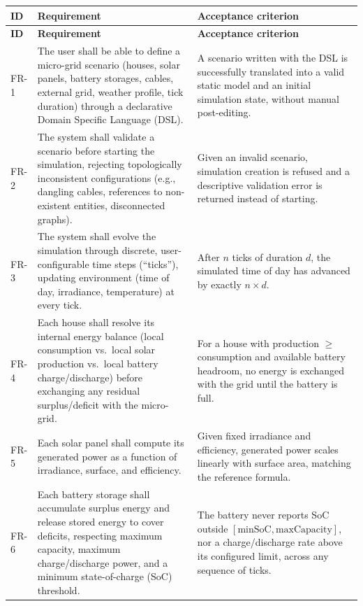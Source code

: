 \documentclass{scrreprt}
\begin{document}
  \begin{longtable}{@{}p{1.5cm} p{6.3cm} p{6.3cm}@{}}
  \toprule
  \textbf{ID} & \textbf{Requirement} & \textbf{Acceptance criterion} \\
  \midrule
  \endfirsthead
  \toprule
  \textbf{ID} & \textbf{Requirement} & \textbf{Acceptance criterion} \\
  \midrule
  \endhead
  \bottomrule
  \endfoot

  FR-1 &
  The user shall be able to define a micro-grid scenario (houses, solar
  panels,
  battery storages, cables, external grid, weather profile, tick duration)
  through a declarative Domain Specific Language (DSL). &
  A scenario written with the DSL is successfully translated into a valid
  static model and an initial simulation state, without manual
  post-editing. \\

  FR-2 &
  The system shall validate a scenario before starting the simulation,
  rejecting topologically inconsistent configurations (e.g., dangling
  cables,
  references to non-existent entities, disconnected graphs). &
  Given an invalid scenario, simulation creation is refused and a
  descriptive
  validation error is returned instead of starting. \\

  FR-3 &
  The system shall evolve the simulation through discrete, user-configurable
  time steps (``ticks''), updating environment (time of day, irradiance,
  temperature) at every tick. &
  After $n$ ticks of duration $d$, the simulated time of day has advanced by
  exactly $n \times d$. \\

  FR-4 &
  Each house shall resolve its internal energy balance (local consumption
  vs.\
  local solar production vs.\ local battery charge/discharge) before
  exchanging any residual surplus/deficit with the micro-grid. &
  For a house with production $\geq$ consumption and available battery
  headroom, no energy is exchanged with the grid until the battery is full.
  \\

  FR-5 &
  Each solar panel shall compute its generated power as a function of
  irradiance, surface, and efficiency. &
  Given fixed irradiance and efficiency, generated power scales linearly
  with
  surface area, matching the reference formula. \\

  FR-6 &
  Each battery storage shall accumulate surplus energy and release stored
  energy to cover deficits, respecting maximum capacity, maximum
  charge/discharge power, and a minimum state-of-charge (SoC) threshold. &
  The battery never reports SoC outside $[\text{minSoC},
  \text{maxCapacity}]$,
  nor a charge/discharge rate above its configured limit, across any
  sequence
  of ticks. \\


\end{longtable}
\end{document}
